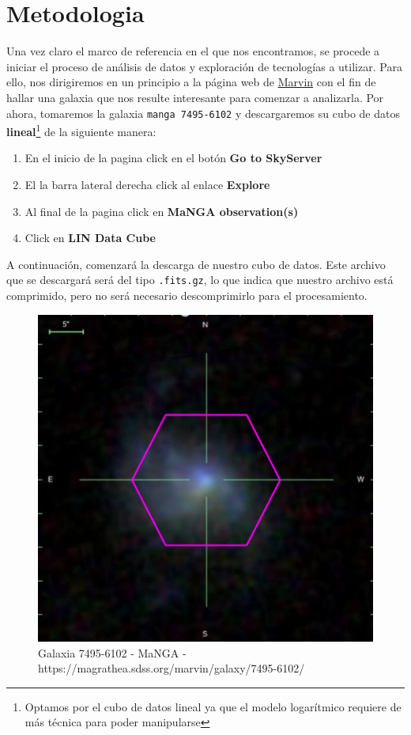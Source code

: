 \documentclass[9pt,twocolumn,a4paper]{opticajnl}
\begin{document}
\section*{Metodologia}
Una vez claro el marco de referencia en el que nos encontramos, se procede a iniciar el proceso de análisis de datos y exploración de tecnologías a utilizar. Para ello, nos dirigiremos en un principio a la página web de \href{https://magrathea.sdss.org/marvin/}{Marvin} con el fin de hallar una galaxia que nos resulte interesante para comenzar a analizarla. Por ahora, tomaremos la galaxia \verb|manga 7495-6102| y descargaremos su cubo de datos \textbf{lineal}\footnote{Optamos por el cubo de datos lineal ya que el modelo logarítmico requiere de más técnica para poder manipularse} de la siguiente manera:
\begin{enumerate}
    \item En el inicio de la pagina click en el botón \textbf{Go to SkyServer}
    \item El la barra lateral derecha click al enlace \textbf{Explore}
    \item Al final de la pagina click en \textbf{MaNGA observation(s)}
    \item Click en \textbf{LIN Data Cube}
\end{enumerate}
A continuación, comenzará la descarga de nuestro cubo de datos. Este archivo que se descargará será del tipo \verb|.fits.gz|, lo que indica que nuestro archivo está comprimido, pero no será necesario descomprimirlo para el procesamiento.

\begin{figure}
    \centering
    \includegraphics[width=0.8\linewidth]{manga-7495-6102.png}
    \caption{Galaxia 7495-6102 - MaNGA - https://magrathea.sdss.org/marvin/galaxy/7495-6102/}
    \label{fig:interfacemarvin}
\end{figure}
 
\end{document}
